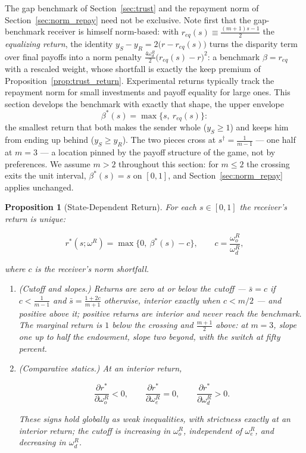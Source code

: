 \documentclass[11pt]{article}
\theoremstyle{plain}
\newtheorem{proposition}{Proposition}
\theoremstyle{remark}
\begin{document}
The gap benchmark of Section~\ref{sec:trust} and the repayment norm of Section~\ref{sec:norm_repay} need not be exclusive.  Note first that the gap-benchmark receiver is himself norm-based: with $r_{eq}(s)\equiv\frac{(m+1)s-1}{2}$ the \emph{equalizing return}, the identity $y_S-y_R=2\big(r-r_{eq}(s)\big)$ turns the disparity term over final payoffs into a norm penalty $\frac{4\omega_d^{R}}{2}\big(r_{eq}(s)-r\big)^2$: a benchmark $\beta=r_{eq}$ with a rescaled weight, whose shortfall is exactly the keep premium of Proposition~\ref{prop:trust_return}.  Experimental returns typically track the repayment norm for small investments and payoff equality for large ones.  This section develops the benchmark with exactly that shape, the upper envelope
\begin{equation}
\label{eq:norm3_benchmark}
        \beta^\ast(s)=\max\big\{s,\ r_{eq}(s)\big\} :
\end{equation}
the smallest return that both makes the sender whole ($y_S\ge1$) and keeps him from ending up behind ($y_S\ge y_R$).  The two pieces cross at $s^\dagger=\frac1{m-1}$ --- one half at $m=3$ --- a location pinned by the payoff structure of the game, not by preferences.  We assume $m>2$ throughout this section: for $m\le2$ the crossing exits the unit interval, $\beta^\ast(s)=s$ on $[0,1]$, and Section~\ref{sec:norm_repay} applies unchanged.

\begin{proposition}[State-Dependent Return]
\label{prop:norm3_receiver}
For each $s\in[0,1]$ the receiver's return is unique:
\begin{csbox}
\[
        r^\ast(s;\omega^R)=\max\big\{0,\ \beta^\ast(s)-c\big\},
        \qquad
        c=\frac{\omega_o^{R}}{\omega_d^{R}},
\]
\end{csbox}
where $c$ is the receiver's norm shortfall.
\begin{enumerate}[topsep=2pt,itemsep=2pt]
\item \emph{(Cutoff and slopes.)}  Returns are zero at or below the cutoff --- $\bar s=c$ if $c<\frac1{m-1}$ and $\bar s=\frac{1+2c}{m+1}$ otherwise, interior exactly when $c<m/2$ --- and positive above it; positive returns are interior and never reach the benchmark.  The marginal return is $1$ below the crossing and $\frac{m+1}2$ above: at $m=3$, slope one up to half the endowment, slope two beyond, with the switch at fifty percent.
\item \emph{(Comparative statics.)}  At an interior return,
\begin{csbox}
\[
        \frac{\partial r^\ast}{\partial \omega_o^{R}}<0,
        \qquad
        \frac{\partial r^\ast}{\partial \omega_e^{R}}=0,
        \qquad
        \frac{\partial r^\ast}{\partial \omega_d^{R}}>0.
\]
\end{csbox}
These signs hold globally as weak inequalities, with strictness exactly at an interior return; the cutoff is increasing in $\omega_o^{R}$, independent of $\omega_e^{R}$, and decreasing in $\omega_d^{R}$.
\end{enumerate}
\end{proposition}
\end{document}
